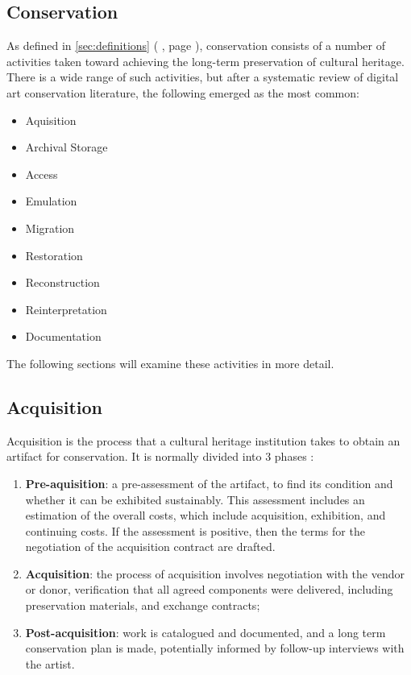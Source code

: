 \subsection{Conservation}

As defined in \autoref{sec:definitions} ( , page \pageref{sec:definitions}), conservation consists of a number of activities taken toward achieving the long-term preservation of cultural heritage. There is a wide range of such activities, but after a systematic review of digital art conservation literature, the following emerged as the most common:

\begin{itemize}
    \item Aquisition
    \item Archival Storage
    \item Access
    \item Emulation
    \item Migration
    \item Restoration
    \item Reconstruction
    \item Reinterpretation
    \item Documentation
\end{itemize}

The following sections will examine these activities in more detail.

\subsection{Acquisition}

Acquisition is the process that a cultural heritage institution takes to obtain an artifact for conservation. It is normally divided into 3 phases \cite{ahtilaAcquiringMediaArt1998}:

\begin{enumerate}
    \item \textbf{Pre-aquisition}: a pre-assessment of the artifact, to find its condition and whether it can be exhibited sustainably. This assessment includes an estimation of the overall costs, which include acquisition, exhibition, and continuing costs. If the assessment is positive, then the terms for the negotiation of the acquisition contract are drafted.
    \item  \textbf{Acquisition}: the process of acquisition involves negotiation with the vendor or donor, verification that all agreed components were delivered, including preservation materials, and exchange contracts;
    \item  \textbf{Post-acquisition}: work is catalogued and documented, and a long term conservation plan is made, potentially informed by follow-up interviews with the artist.
\end{enumerate}

